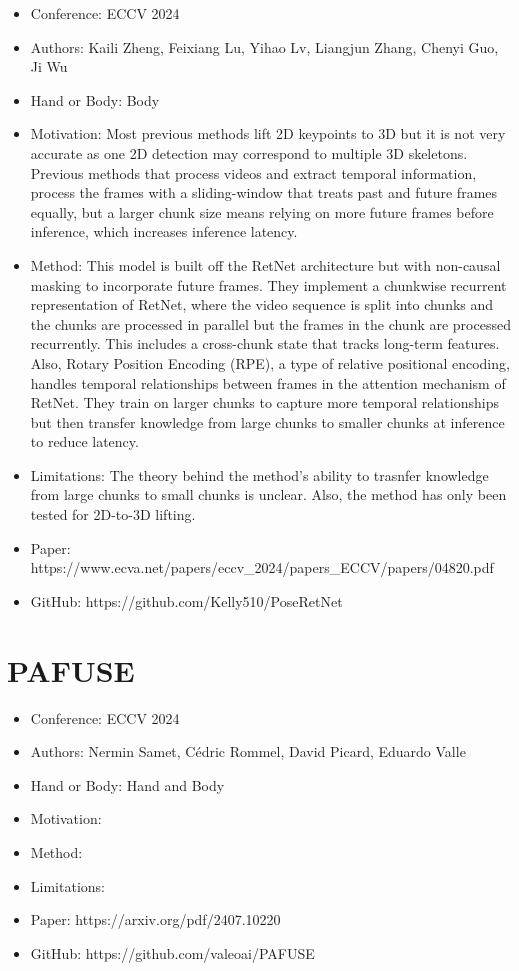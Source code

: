 \documentclass{article}
\begin{document}
\begin{itemize}
    \item Conference: ECCV 2024
    \item Authors: Kaili Zheng, Feixiang Lu, Yihao Lv, Liangjun Zhang, Chenyi Guo, Ji Wu
    \item Hand or Body: Body
    \item Motivation: Most previous methods lift 2D keypoints to 3D but it is not very accurate as one 2D detection may correspond to multiple 3D skeletons. Previous methods that process videos and extract temporal information, process the frames with a sliding-window that treats past and future frames equally, but a larger chunk size means relying on more future frames before inference, which increases inference latency.
    \item Method: This model is built off the RetNet architecture but with non-causal masking to incorporate future frames. They implement a chunkwise recurrent representation of RetNet, where the video sequence is split into chunks and the chunks are processed in parallel but the frames in the chunk are processed recurrently. This includes a cross-chunk state that tracks long-term features. Also, Rotary Position Encoding (RPE), a type of relative positional encoding, handles temporal relationships between frames in the attention mechanism of RetNet. They train on larger chunks to capture more temporal relationships but then transfer knowledge from large chunks to smaller chunks at inference to reduce latency.
    \item Limitations: The theory behind the method's ability to trasnfer knowledge from large chunks to small chunks is unclear. Also, the method has only been tested for 2D-to-3D lifting.
    \item Paper: https://www.ecva.net/papers/eccv\_2024/papers\_ECCV/papers/04820.pdf
    \item GitHub: https://github.com/Kelly510/PoseRetNet
\end{itemize}

\section*{PAFUSE}

\begin{itemize}
    \item Conference: ECCV 2024
    \item Authors: Nermin Samet, Cédric Rommel, David Picard, Eduardo Valle
    \item Hand or Body: Hand and Body
    \item Motivation:
    \item Method:
    \item Limitations:
    \item Paper: https://arxiv.org/pdf/2407.10220
    \item GitHub: https://github.com/valeoai/PAFUSE
\end{itemize}
\end{document}
